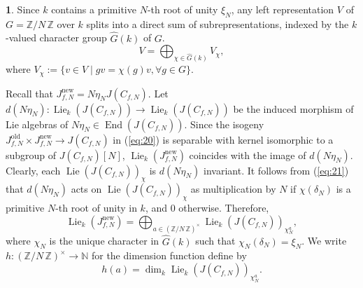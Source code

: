 \documentclass{amsart}[11pt]
\theoremstyle{definition}
\newtheorem{sect}[thm]{}
\numberwithin{equation}{section}
\theoremstyle{notitle}
\begin{document}
\begin{sect}
  Since $k$ contains a primitive $N$-th root of unity $\xi_N$, any
  left representation $V$ of $G={\mathbb{Z}/ {N}\, \mathbb{Z}}$ over $k$ splits into a
  direct sum of subrepresentations, indexed by the $k$-valued
  character group $\widehat{G}(k)$ of $G$.
  \begin{equation}
    \label{eq:23}
    V= \bigoplus_{\chi\in \widehat{G}(k)} V_\chi, 
  \end{equation}
  where $V_\chi:=\{ v\in V\mid gv = \chi(g) v, \forall g\in G\}$.

  Recall that $J_{f,N}^{\mathrm{new}} = N\eta_N J(C_{f,N})$. Let $d(N\eta_N):
  \operatorname{Lie}_k(J(C_{f,N}))\to \operatorname{Lie}_k(J(C_{f,N}))$ be the induced morphism of
  Lie algebras of $N\eta_N\in \operatorname{End}(J(C_{f,N}))$.  Since the isogeny
  $J_{f,N}^{\mathrm{old}} \times J_{f,N}^{\mathrm{new}} \to J(C_{f,N})$ in (\ref{eq:20}) is
  separable with kernel isomorphic to a subgroup of $J(C_{f,N})[N]$,
  $\operatorname{Lie}_k(J_{f,N}^{\mathrm{new}})$ coincides with the image of $d(N\eta_N)$.
  Clearly, each $\operatorname{Lie}(J(C_{f,N}))_\chi$ is $d(N\eta_N)$ invariant. It
  follows from (\ref{eq:21}) that $d(N\eta_N)$ acts on
  $\operatorname{Lie}(J(C_{f,N}))_\chi$ as multiplication by $N$ if $\chi(\delta_N)$
  is a primitive $N$-th root of unity in $k$, and $0$
  otherwise. Therefore, 
  \begin{equation}
    \label{eq:24}
    \operatorname{Lie}_k(J_{f,N}^{\mathrm{new}})= \bigoplus_{a\in {(\mathbb{Z}/ {N}\, \mathbb{Z})^\times}} \operatorname{Lie}_k(J(C_{f,N}))_{\chi_N^a},
  \end{equation}
  where $\chi_N$ is the unique character in $\widehat{G}(k)$ such that
  $\chi_N(\delta_N)=\xi_N$.  We write $h: {(\mathbb{Z}/ {N}\, \mathbb{Z})^\times}\to {\mathbb{N}}$ for the
  dimension function define by 
\begin{equation}
  \label{eq:25}
h(a)= \dim_k \operatorname{Lie}_k(J(C_{f,N}))_{\chi_N^a}.
\end{equation}


\end{sect}
\end{document}
